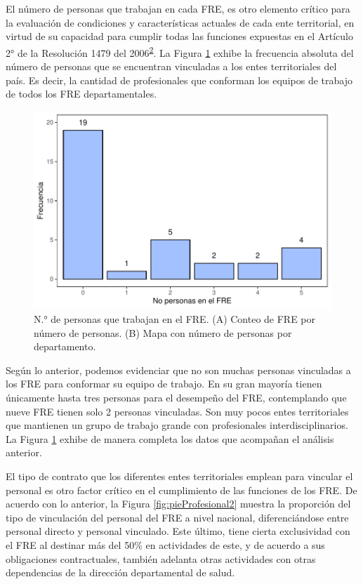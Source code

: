 \documentclass[
]{book}
\begin{document}
El número de personas que trabajan en cada FRE, es otro elemento crítico para la evaluación de condiciones y características actuales de cada ente territorial, en virtud de su capacidad para cumplir todas las funciones expuestas en el Artículo 2° de la Resolución 1479 del 2006\textsuperscript{\protect\hyperlink{ref-MSPS1479-2006}{2}}. La Figura \ref{fig:perfilProfesional3} exhibe la frecuencia absoluta del número de personas que se encuentran vinculadas a los entes territoriales del país. Es decir, la cantidad de profesionales que conforman los equipos de trabajo de todos los FRE departamentales.

\begin{figure}[bh]

{\centering \includegraphics[width=1\linewidth]{InformeFinal_files/figure-latex/perfilProfesional3-1} 

}

\caption{N.° de personas que trabajan en el FRE. (A) Conteo de FRE por número de personas. (B) Mapa con número de personas por departamento.}\label{fig:perfilProfesional3}
\end{figure}

Según lo anterior, podemos evidenciar que no son muchas personas vinculadas a los FRE para conformar su equipo de trabajo. En su gran mayoría tienen únicamente hasta tres personas para el desempeño del FRE, contemplando que nueve FRE tienen solo 2 personas vinculadas. Son muy pocos entes territoriales que mantienen un grupo de trabajo grande con profesionales interdisciplinarios. La Figura \ref{fig:perfilProfesional3} exhibe de manera completa los datos que acompañan el análisis anterior.

El tipo de contrato que los diferentes entes territoriales emplean para vincular el personal es otro factor crítico en el cumplimiento de las funciones de los FRE. De acuerdo con lo anterior, la Figura \ref{fig:pieProfesional2} muestra la proporción del tipo de vinculación del personal del FRE a nivel nacional, diferenciándose entre personal directo y personal vinculado. Este último, tiene cierta exclusividad con el FRE al destinar más del 50\% en actividades de este, y de acuerdo a sus obligaciones contractuales, también adelanta otras actividades con otras dependencias de la dirección departamental de salud.
\end{document}
